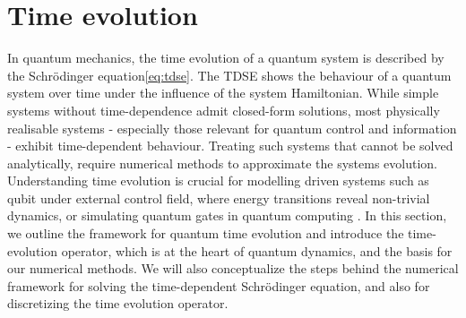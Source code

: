 \documentclass{subfiles}
\begin{document}
\section{Time evolution}\label{sec:time_evolution}
In quantum mechanics, the time evolution of a quantum system is described by the Schrödinger equation\eqref{eq:tdse}. The TDSE shows the behaviour of a quantum system over time under the influence of the system Hamiltonian. While simple systems without time-dependence admit closed-form solutions, most physically realisable systems - especially those relevant for quantum control and information - exhibit time-dependent behaviour. Treating such systems that cannot be solved analytically, require numerical methods to approximate the systems evolution. Understanding time evolution is crucial for modelling driven systems such as qubit under external control field, where energy transitions reveal non-trivial dynamics\cite{landau1932theorie, zener1932non}, or simulating quantum gates in quantum computing \cite{leinonen2024coulomb, nazir2005anticrossings}. In this section, we outline the framework for quantum time evolution and introduce the time-evolution operator, which is at the heart of quantum dynamics, and the basis for our numerical methods. We will also conceptualize the steps behind the numerical framework for solving the time-dependent Schrödinger equation, and also for discretizing the time evolution operator. \\
\end{document}
